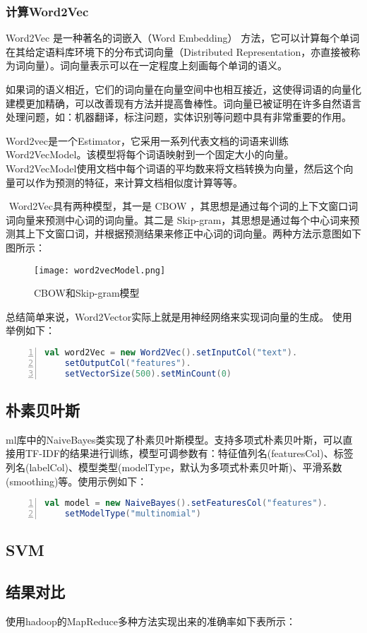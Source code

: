 \documentclass[lang=cn,11pt]{elegantpaper}
\begin{document}
\subsubsection{计算Word2Vec}
Word2Vec 是一种著名的词嵌入（Word Embedding） 方法，它可以计算每个单词在其给定语料库环境下的分布式词向量（Distributed Representation，亦直接被称为词向量）。词向量表示可以在一定程度上刻画每个单词的语义。

如果词的语义相近，它们的词向量在向量空间中也相互接近，这使得词语的向量化建模更加精确，可以改善现有方法并提高鲁棒性。词向量已被证明在许多自然语言处理问题，如：机器翻译，标注问题，实体识别等问题中具有非常重要的作用。

​ Word2vec是一个Estimator，它采用一系列代表文档的词语来训练Word2VecModel。该模型将每个词语映射到一个固定大小的向量。Word2VecModel使用文档中每个词语的平均数来将文档转换为向量，然后这个向量可以作为预测的特征，来计算文档相似度计算等等。

​ Word2Vec具有两种模型，其一是 CBOW ，其思想是通过每个词的上下文窗口词词向量来预测中心词的词向量。其二是 Skip-gram，其思想是通过每个中心词来预测其上下文窗口词，并根据预测结果来修正中心词的词向量。两种方法示意图如下图所示：
\begin{figure}[htbp]
	\centering
	\texttt{[image: word2vecModel.png]}
	\caption{CBOW和Skip-gram模型 \label{fig:Word2VecModel}}
\end{figure}
总结简单来说，Word2Vector实际上就是用神经网络来实现词向量的生成。
使用举例如下：
\begin{lstlisting}[language={Scala},numbers=left,numberstyle=\tiny,%frame=shadowbox,  
  rulesepcolor=\color{red!20!green!20!blue!20},  
  keywordstyle=\color{blue!70!black},  
  commentstyle=\color{blue!90!},  
  basicstyle=\ttfamily]  
val word2Vec = new Word2Vec().setInputCol("text").
	setOutputCol("features").
	setVectorSize(500).setMinCount(0)
\end{lstlisting}\par

\subsection{朴素贝叶斯}
ml库中的NaiveBayes类实现了朴素贝叶斯模型。支持多项式朴素贝叶斯，可以直接用TF-IDF的结果进行训练，模型可调参数有：特征值列名(featuresCol)、标签列名(labelCol)、模型类型(modelType，默认为多项式朴素贝叶斯)、平滑系数(smoothing)等。使用示例如下：
\begin{lstlisting}[language={Scala},numbers=left,numberstyle=\tiny,%frame=shadowbox,  
  rulesepcolor=\color{red!20!green!20!blue!20},  
  keywordstyle=\color{blue!70!black},  
  commentstyle=\color{blue!90!},  
  basicstyle=\ttfamily]  
val model = new NaiveBayes().setFeaturesCol("features").
	setModelType("multinomial")
\end{lstlisting}\par
\subsection{SVM}

\subsection{结果对比}
使用hadoop的MapReduce多种方法实现出来的准确率如下表所示：
\end{document}
